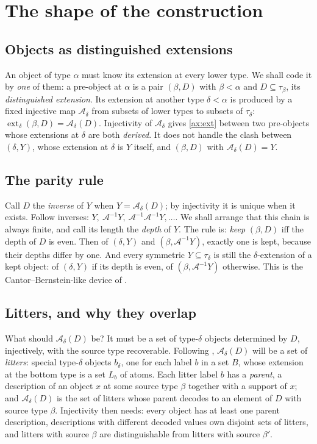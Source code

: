 \documentclass[11pt]{article}
\theoremstyle{definition}
\theoremstyle{remark}
\newcommand{\ext}{\operatorname{ext}}
\newcommand{\calA}{\mathcal A}
\begin{document}
\section{The shape of the construction}\label{sec:strategy}

\subsection{Objects as distinguished extensions}
An object of type \(\alpha\) must know its extension at every lower
type. We shall code it by \emph{one} of them: a pre-object at \(\alpha\) is
a pair \((\beta,D)\) with \(\beta<\alpha\) and \(D\subseteq\tau_\beta\),
its \emph{distinguished extension}. Its extension at another type
\(\delta<\alpha\) is produced by a fixed injective map
\(\calA_\delta\) from subsets of lower types to subsets of \(\tau_\delta\):
\(\ext_\delta(\beta,D)=\calA_\delta(D)\). Injectivity of \(\calA_\delta\)
gives \ref{ax:ext} between two pre-objects whose extensions at \(\delta\)
are both \emph{derived}. It does not handle the clash between
\((\delta,Y)\), whose extension at \(\delta\) is \(Y\) itself, and
\((\beta,D)\) with \(\calA_\delta(D)=Y\).

\subsection{The parity rule}
Call \(D\) the \emph{inverse} of \(Y\) when \(Y=\calA_\delta(D)\); by
injectivity it is unique when it exists. Follow inverses:
\(Y,\ \calA^{-1}Y,\ \calA^{-1}\calA^{-1}Y,\dots\). We shall arrange that
this chain is always finite, and call its length the \emph{depth} of
\(Y\). The rule is: \emph{keep} \((\beta,D)\) iff the depth of \(D\) is
even. Then of \((\delta,Y)\) and \((\beta,\calA^{-1}Y)\), exactly one is
kept, because their depths differ by one. And every symmetric
\(Y\subseteq\tau_\delta\) is still the \(\delta\)-extension of a kept
object: of \((\delta,Y)\) if its depth is even, of \((\beta,\calA^{-1}Y)\)
otherwise. This is the Cantor--Bernstein-like device of \cite{HW}.

\subsection{Litters, and why they overlap}
What should \(\calA_\delta(D)\) be? It must be a set of type-\(\delta\)
objects determined by \(D\), injectively, with the source type recoverable.
Following \cite{HW}, \(\calA_\delta(D)\) will be a set of \emph{litters}:
special type-\(\delta\) objects \(b_\delta\), one for each label \(b\) in
a set \(B\), whose extension at the bottom type is a set \(L_b\) of atoms.
Each litter label \(b\) has a \emph{parent}, a description of an object
\(x\) at some source type \(\beta\) together with a support of \(x\); and
\(\calA_\delta(D)\) is the set of litters whose parent decodes to an
element of \(D\) with source type \(\beta\). Injectivity then needs: every
object has at least one parent description, descriptions with different
decoded values own disjoint sets of litters, and litters with source
\(\beta\) are distinguishable from litters with source \(\beta'\).
\end{document}
